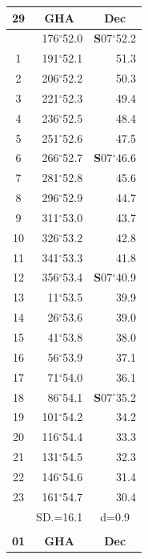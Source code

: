 \documentclass[10pt, a4paper]{report}
\begin{document}
\begin{scriptsize}
\begin{tabular*}{0.2\textwidth}[t]{@{\extracolsep{\fill}}|c|rr|}
\hline
\multicolumn{1}{|c|}{\rule{0pt}{2.6ex}\textbf{29}} & \multicolumn{1}{c}{\textbf{GHA}} & \multicolumn{1}{c|}{\textbf{Dec}}\\
\hline\rule{0pt}{2.6ex}\noindent
0 & 176$^\circ$52.0 & \textbf{S}07$^\circ$52.2\\
1 & 191$^\circ$52.1 & 51.3\\
2 & 206$^\circ$52.2 & 50.3\\
3 & 221$^\circ$52.3 & \raisebox{0.24ex}{\boldmath$\cdot$~\boldmath$\cdot$~~}49.4\\
4 & 236$^\circ$52.5 & 48.4\\
5 & 251$^\circ$52.6 & 47.5\\[2Pt]
6 & 266$^\circ$52.7 & \textbf{S}07$^\circ$46.6\\
7 & 281$^\circ$52.8 & 45.6\\
8 & 296$^\circ$52.9 & 44.7\\
9 & 311$^\circ$53.0 & \raisebox{0.24ex}{\boldmath$\cdot$~\boldmath$\cdot$~~}43.7\\
10 & 326$^\circ$53.2 & 42.8\\
11 & 341$^\circ$53.3 & 41.8\\[2Pt]
12 & 356$^\circ$53.4 & \textbf{S}07$^\circ$40.9\\
13 & 11$^\circ$53.5 & 39.9\\
14 & 26$^\circ$53.6 & 39.0\\
15 & 41$^\circ$53.8 & \raisebox{0.24ex}{\boldmath$\cdot$~\boldmath$\cdot$~~}38.0\\
16 & 56$^\circ$53.9 & 37.1\\
17 & 71$^\circ$54.0 & 36.1\\[2Pt]
18 & 86$^\circ$54.1 & \textbf{S}07$^\circ$35.2\\
19 & 101$^\circ$54.2 & 34.2\\
20 & 116$^\circ$54.4 & 33.3\\
21 & 131$^\circ$54.5 & \raisebox{0.24ex}{\boldmath$\cdot$~\boldmath$\cdot$~~}32.3\\
22 & 146$^\circ$54.6 & 31.4\\
23 & 161$^\circ$54.7 & 30.4\\
\hline
\rule{0pt}{2.4ex} & \multicolumn{1}{c}{SD.=16.1} & \multicolumn{1}{c|}{d=0.9}\\
\hline
\multicolumn{1}{c}{}\\[-0.5ex]\hline
\multicolumn{1}{|c|}{\rule{0pt}{2.6ex}\textbf{01}} & \multicolumn{1}{c}{\textbf{GHA}} & \multicolumn{1}{c|}{\textbf{Dec}}\\

\end{tabular*}
\end{scriptsize}
\end{document}
